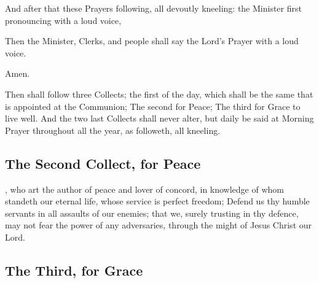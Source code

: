

\begin{rubric}
And after that these Prayers following, all devoutly kneeling: the Minister first pronouncing with a loud voice,
\end{rubric}




\begin{rubric}
Then the Minister, Clerks, and people shall say the Lord's Prayer with a loud voice.
\end{rubric}


Amen.


\begin{rubric}
Then shall follow three Collects; the first of the day, which shall be the same that is appointed at the Communion; The second for Peace; The third for Grace to live well. And the two last Collects shall never alter, but daily be said at Morning Prayer throughout all the year, as followeth, all kneeling.
\end{rubric}

\subsection{The Second Collect, for Peace}

, who art the author of peace and lover of concord, in knowledge of whom standeth our eternal life, whose service is perfect freedom; Defend us thy humble servants in all assaults of our enemies; that we, surely trusting in thy defence, may not fear the power of any adversaries, through the might of Jesus Christ our Lord.

\subsection{The Third, for Grace}

